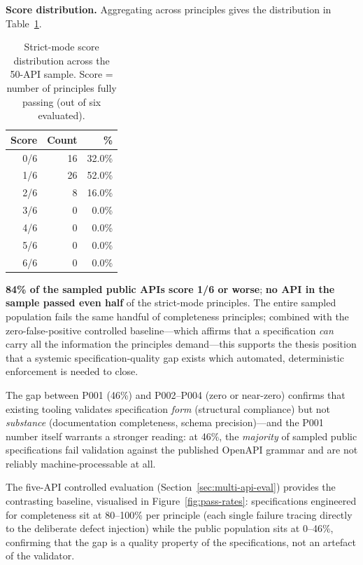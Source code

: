 \textbf{Score distribution.} Aggregating across principles gives the distribution in Table~\ref{tab:score-distribution}.

\begin{table}[htbp]
\centering
\caption{Strict-mode score distribution across the 50-API sample. Score = number of principles fully passing (out of six evaluated).}
\label{tab:score-distribution}
\small
\begin{tabular}{@{}rrr@{}}
\toprule
\textbf{Score} & \textbf{Count} & \textbf{\%} \\
\midrule
0/6 & 16 & 32.0\% \\
1/6 & 26 & 52.0\% \\
2/6 &  8 & 16.0\% \\
3/6 &  0 &  0.0\% \\
4/6 &  0 &  0.0\% \\
5/6 &  0 &  0.0\% \\
6/6 &  0 &  0.0\% \\
\bottomrule
\end{tabular}
\end{table}

\textbf{84\% of the sampled public APIs score 1/6 or worse}; \textbf{no API in the sample passed even half} of the strict-mode principles. The entire sampled population fails the same handful of completeness principles; combined with the zero-false-positive controlled baseline---which affirms that a specification \emph{can} carry all the information the principles demand---this supports the thesis position that a systemic specification-quality gap exists which automated, deterministic enforcement is needed to close.

The gap between P001 (46\%) and P002--P004 (zero or near-zero) confirms that existing tooling validates specification \textit{form} (structural compliance) but not \textit{substance} (documentation completeness, schema precision)---and the P001 number itself warrants a stronger reading: at 46\%, the \emph{majority} of sampled public specifications fail validation against the published OpenAPI grammar and are not reliably machine-processable at all.

The five-API controlled evaluation (Section~\ref{sec:multi-api-eval}) provides the contrasting baseline, visualised in Figure~\ref{fig:pass-rates}: specifications engineered for completeness sit at 80--100\% per principle (each single failure tracing directly to the deliberate defect injection) while the public population sits at 0--46\%, confirming that the gap is a quality property of the specifications, not an artefact of the validator.


